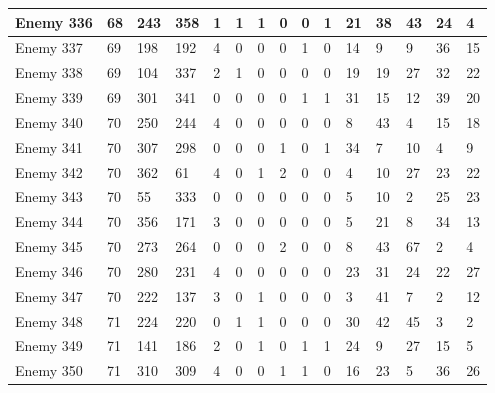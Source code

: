 \begin{sidewaystable}[!h]
{\begin{tabular}{|l|l|l|l|l|l|l|l|l|l|l|l|l|l|l|}
			Enemy 336 & 68 & 243 & 358 & 1 & 1 & 1 & 0 & 0 & 1 & 21 & 38 & 43 & 24 & 4 \\ \hline
			Enemy 337 & 69 & 198 & 192 & 4 & 0 & 0 & 0 & 1 & 0 & 14 & 9 & 9 & 36 & 15 \\ \hline
			Enemy 338 & 69 & 104 & 337 & 2 & 1 & 0 & 0 & 0 & 0 & 19 & 19 & 27 & 32 & 22 \\ \hline
			Enemy 339 & 69 & 301 & 341 & 0 & 0 & 0 & 0 & 1 & 1 & 31 & 15 & 12 & 39 & 20 \\ \hline
			Enemy 340 & 70 & 250 & 244 & 4 & 0 & 0 & 0 & 0 & 0 & 8 & 43 & 4 & 15 & 18 \\ \hline
			Enemy 341 & 70 & 307 & 298 & 0 & 0 & 0 & 1 & 0 & 1 & 34 & 7 & 10 & 4 & 9 \\ \hline
			Enemy 342 & 70 & 362 & 61 & 4 & 0 & 1 & 2 & 0 & 0 & 4 & 10 & 27 & 23 & 22 \\ \hline
			Enemy 343 & 70 & 55 & 333 & 0 & 0 & 0 & 0 & 0 & 0 & 5 & 10 & 2 & 25 & 23 \\ \hline
			Enemy 344 & 70 & 356 & 171 & 3 & 0 & 0 & 0 & 0 & 0 & 5 & 21 & 8 & 34 & 13 \\ \hline
			Enemy 345 & 70 & 273 & 264 & 0 & 0 & 0 & 2 & 0 & 0 & 8 & 43 & 67 & 2 & 4 \\ \hline
			Enemy 346 & 70 & 280 & 231 & 4 & 0 & 0 & 0 & 0 & 0 & 23 & 31 & 24 & 22 & 27 \\ \hline
			Enemy 347 & 70 & 222 & 137 & 3 & 0 & 1 & 0 & 0 & 0 & 3 & 41 & 7 & 2 & 12 \\ \hline
			Enemy 348 & 71 & 224 & 220 & 0 & 1 & 1 & 0 & 0 & 0 & 30 & 42 & 45 & 3 & 2 \\ \hline
			Enemy 349 & 71 & 141 & 186 & 2 & 0 & 1 & 0 & 1 & 1 & 24 & 9 & 27 & 15 & 5 \\ \hline
			Enemy 350 & 71 & 310 & 309 & 4 & 0 & 0 & 1 & 1 & 0 & 16 & 23 & 5 & 36 & 26 \\ \hline
		\end{tabular}%
	}
\end{sidewaystable}
\clearpage


